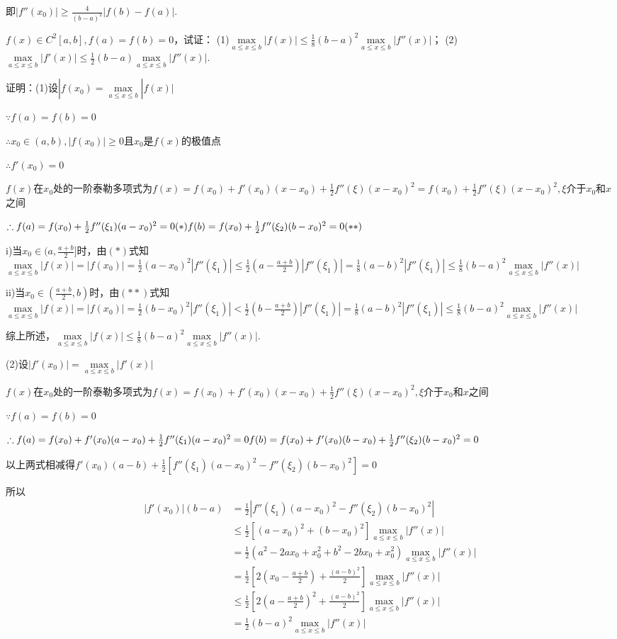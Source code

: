 \documentclass[12pt,UTF8]{ctexart}
\begin{document}
\begin{enumerate}
即$|f''(x_0)|\geq\frac4{(b-a)^2}|f(b)-f(a)|$.

$f(x)\in C^2[a,b],f(a)=f(b)=0$，试证：
\newline
(1)$\max\limits_{a\leq x\leq b}|f(x)|\leq\frac18(b-a)^2\max\limits_{a\leq x\leq b}|f''(x)|$；
\newline
(2)$\max\limits_{a\leq x\leq b}|f'(x)|\leq\frac12(b-a)\max\limits_{a\leq x\leq b}|f''(x)|$.

证明：(1)设$|f(x_0)=\max\limits_{a\leq x\leq b}|f(x)|$

$\because f(a)=f(b)=0$

$\therefore x_0\in(a,b),|f(x_0)|\geq0$且$x_0$是$f(x)$的极值点

$\therefore f'(x_0)=0$

$f(x)$在$x_0$处的一阶泰勒多项式为$f(x)=f(x_0)+f'(x_0)(x-x_0)+\frac12f''(\xi)(x-x_0)^2=f(x_0)+\frac12f''(\xi)(x-x_0)^2,\xi$介于$x_0$和$x$之间

$\therefore f(a)=f(x_0)+\frac12f''(\xi_1)(a-x_0)^2=0(*)\\
f(b)=f(x_0)+\frac12f''(\xi_2)(b-x_0)^2=0(**)$

i)当$x_0\in(a,\frac{a+b}2]$时，由$(*)$式知$\max\limits_{a\leq x\leq b}|f(x)|=|f(x_0)|=\frac12(a-x_0)^2|f''(\xi_1)|\leq\frac12(a-\frac{a+b}2)|f''(\xi_1)|=\frac18(a-b)^2|f''(\xi_1)|\leq\frac18(b-a)^2\max\limits_{a\leq x\leq b}|f''(x)|$

ii)当$x_0\in(\frac{a+b}2,b)$时，由$(**)$式知$\max\limits_{a\leq x\leq b}|f(x)|=|f(x_0)|=\frac12(b-x_0)^2|f''(\xi_1)|<\frac12(b-\frac{a+b}2)|f''(\xi_1)|=\frac18(a-b)^2|f''(\xi_1)|\leq\frac18(b-a)^2\max\limits_{a\leq x\leq b}|f''(x)|$

综上所述，$\max\limits_{a\leq x\leq b}|f(x)|\leq\frac18(b-a)^2\max\limits_{a\leq x\leq b}|f''(x)|$.

(2)设$|f'(x_0)|=\max\limits_{a\leq x\leq b}|f'(x)|$

$f(x)$在$x_0$处的一阶泰勒多项式为$f(x)=f(x_0)+f'(x_0)(x-x_0)+\frac12f''(\xi)(x-x_0)^2,\xi$介于$x_0$和$x$之间

$\because f(a)=f(b)=0$

$\therefore f(a)=f(x_0)+f'(x_0)(a-x_0)+\frac12f''(\xi_1)(a-x_0)^2=0\\
f(b)=f(x_0)+f'(x_0)(b-x_0)+\frac12f''(\xi_2)(b-x_0)^2=0$

以上两式相减得$f'(x_0)(a-b)+\frac12[f''(\xi_1)(a-x_0)^2-f''(\xi_2)(b-x_0)^2]=0$

所以
\[\begin{split}
|f'(x_0)|(b-a)&=\frac12|f''(\xi_1)(a-x_0)^2-f''(\xi_2)(b-x_0)^2|\\
&\leq\frac12[(a-x_0)^2+(b-x_0)^2]\max\limits_{a\leq x\leq b}|f''(x)|\\
&=\frac12(a^2-2ax_0+x_0^2+b^2-2bx_0+x_0^2)\max\limits_{a\leq x\leq b}|f''(x)|\\
&=\frac12[2(x_0-\frac{a+b}2)+\frac{(a-b)^2}2]\max\limits_{a\leq x\leq b}|f''(x)|\\
&\leq\frac12[2(a-\frac{a+b}2)^2+\frac{(a-b)^2}2]\max\limits_{a\leq x\leq b}|f''(x)|\\
&=\frac12(b-a)^2\max\limits_{a\leq x\leq b}|f''(x)|
\end{split}\]


\end{enumerate}
\end{document}
